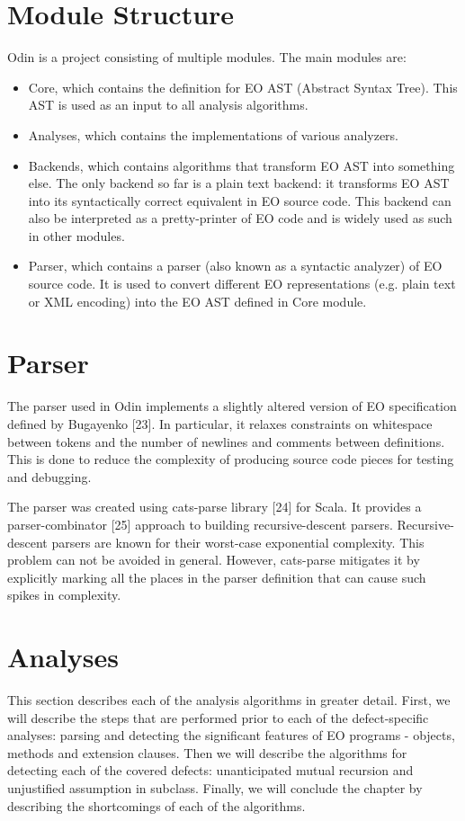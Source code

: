 \section{Module Structure}
Odin is a project consisting of multiple modules. The main modules are:
\begin{itemize}
    \item Core, which contains the definition for EO AST (Abstract Syntax Tree).
          This AST is used as an input to all analysis algorithms.
    \item Analyses, which contains the implementations of various analyzers.
    \item Backends, which contains algorithms that transform EO AST into something else. The only backend so far is a plain text backend: it transforms EO AST into its syntactically correct equivalent in EO source code. This backend can also be interpreted as a pretty-printer of EO code and is widely used as such in other modules.
    \item Parser, which contains a parser (also known as a syntactic analyzer) of EO source code. It is used to convert different EO representations (e.g. plain text or XML encoding) into the EO AST defined in Core module.
\end{itemize}
\section{Parser}
The parser used in Odin implements a slightly altered version of EO specification defined by Bugayenko [23]. In particular, it relaxes constraints on whitespace between tokens and the number of newlines and comments between definitions. This is done to reduce the complexity of producing source code pieces for testing and debugging.

The parser was created using cats-parse library [24] for Scala. It provides a parser-combinator [25] approach to building recursive-descent parsers. Recursive-descent parsers are known for their worst-case exponential complexity. This problem can not be avoided in general. However, cats-parse mitigates it by explicitly marking all the places in the parser definition that can cause such spikes in complexity.

\section{Analyses}
This section describes each of the analysis algorithms in greater detail. First, we will describe the steps that are performed prior to each of the defect-specific analyses: parsing and detecting the significant features of EO programs - objects, methods and extension clauses. Then we will describe the algorithms for detecting each of the covered defects: unanticipated mutual recursion and unjustified assumption in subclass. Finally, we will conclude the chapter by describing the shortcomings of each of the algorithms.


